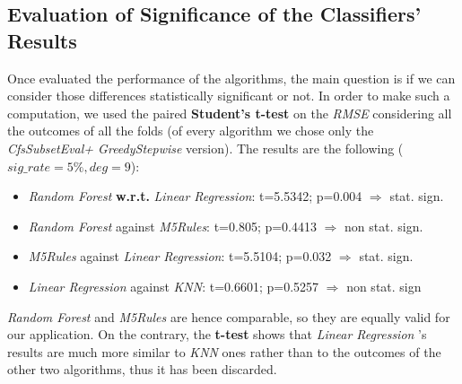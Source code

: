 \subsection{Evaluation of Significance of the Classifiers' Results}
Once evaluated the performance of the algorithms, the main question is if we can consider those differences statistically significant or not. In order to make such a computation, we used the paired \textbf{Student’s t-test} on the \textit{RMSE} considering all the outcomes of all the folds (of every algorithm we chose only the \textit{CfsSubsetEval+ GreedyStepwise} version). The results are the following ($sig\_rate=5\%, deg=9$):

\begin{itemize}
	\item \textit{Random Forest} \textbf{w.r.t.} \textit{Linear Regression}: t=5.5342; p=0.004 $\Rightarrow$ stat. sign.
	\item \textit{Random Forest} against \textit{M5Rules}: t=0.805; p=0.4413 $\Rightarrow$ non stat. sign.
	\item \textit{M5Rules} against \textit{Linear Regression}: t=5.5104; p=0.032  $\Rightarrow$  stat. sign.
	\item \textit{Linear Regression} against \textit{KNN}: t=0.6601; p=0.5257 $\Rightarrow$ non stat. sign
\end{itemize}

 \textit{Random Forest} and \textit{M5Rules} are hence comparable, so they are equally valid for our application. On the contrary, the \textbf{t-test} shows that  \textit{Linear Regression} 's results are much more similar to \textit{KNN} ones rather than to the outcomes of the other two algorithms, thus it has been discarded.